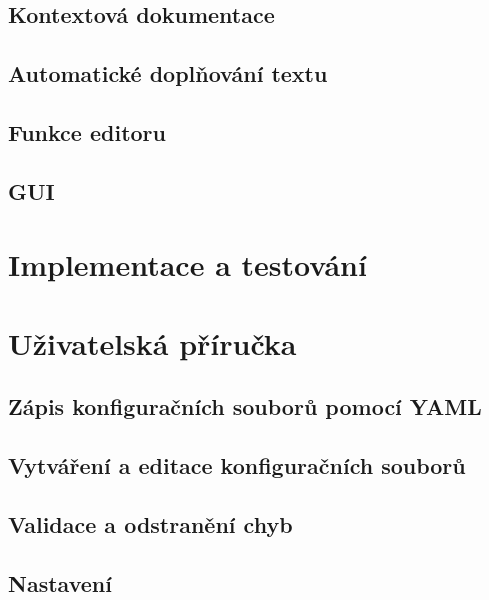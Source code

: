 \documentclass[FM,bw,DP]{tulthesis}
\begin{document}
\section{Kontextová dokumentace}

\section{Automatické doplňování textu}

\section{Funkce editoru}

\section{GUI}


\chapter{Implementace a testování}






\chapter{Uživatelská příručka}

\section{Zápis konfiguračních souborů pomocí YAML}

\section{Vytváření a editace konfiguračních souborů}

\section{Validace a odstranění chyb}

\section{Nastavení} 
\end{document}

